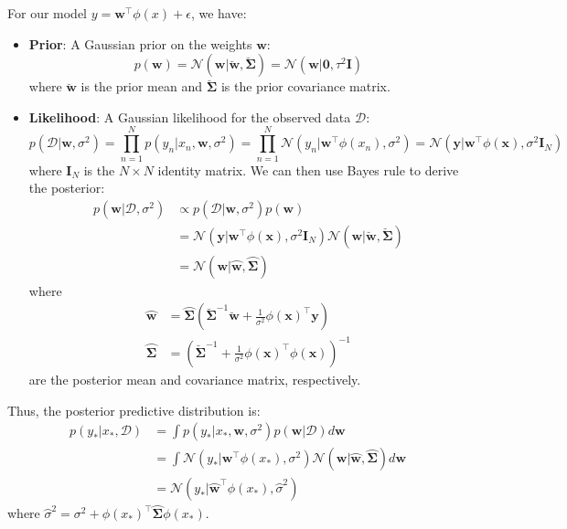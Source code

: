 \documentclass[11pt, a4paper, oneside]{memoir}
\begin{document}
For our model $y = \boldsymbol{w}^\top \phi(x) + \epsilon$, we have:
\begin{itemize}
    \item \textbf{Prior}: A Gaussian prior on the weights $\boldsymbol{w}$:
    \[ p(\boldsymbol{w}) = \mathcal{N}(\boldsymbol{w} | \breve{\boldsymbol{w}}, \breve{\boldsymbol{\Sigma}}) = \mathcal{N}(\boldsymbol{w} | \boldsymbol{0}, \tau^2 \boldsymbol{I}) \]
    where $\breve{\boldsymbol{w}}$ is the prior mean and $\breve{\boldsymbol{\Sigma}}$ is the prior covariance matrix.

    \item \textbf{Likelihood}: A Gaussian likelihood for the observed data $\mathcal{D}$:
    \[ p(\mathcal{D} | \boldsymbol{w}, \sigma^2) = \prod_{n=1}^N p(y_n | x_n, \boldsymbol{w}, \sigma^2) = \prod_{n=1}^N \mathcal{N}(y_n | \boldsymbol{w}^\top \phi(x_n), \sigma^2) = \mathcal{N}(\boldsymbol{y} | \boldsymbol{w}^\top \phi(\boldsymbol{x}), \sigma^2 \boldsymbol{I}_N) \]
    where $\boldsymbol{I}_N$ is the $N \times N$ identity matrix. We can then use Bayes rule to derive the posterior:
    \begin{align*}
      p(\boldsymbol{w} | \mathcal{D}, \sigma^2) &\propto p(\mathcal{D} | \boldsymbol{w}, \sigma^2) p(\boldsymbol{w}) \\
      &= \mathcal{N}(\boldsymbol{y} | \boldsymbol{w}^\top \phi(\boldsymbol{x}), \sigma^2 \boldsymbol{I}_N) \mathcal{N}(\boldsymbol{w} | \breve{\boldsymbol{w}}, \breve{\boldsymbol{\Sigma}}) \\
      &= \mathcal{N}(\boldsymbol{w} | \wideparen{\boldsymbol{w}}, \wideparen{\boldsymbol{\Sigma}})
    \end{align*}
    where
    \begin{align*}
      \wideparen{\boldsymbol{w}} &= \wideparen{\boldsymbol{\Sigma}} (\breve{\boldsymbol{\Sigma}}^{-1} \breve{\boldsymbol{w}} + \frac{1}{\sigma^2} \phi(\boldsymbol{x})^\top \boldsymbol{y}) \\
      \wideparen{\boldsymbol{\Sigma}} &= (\breve{\boldsymbol{\Sigma}}^{-1} + \frac{1}{\sigma^2} \phi(\boldsymbol{x})^\top \phi(\boldsymbol{x}))^{-1}
    \end{align*}
    are the posterior mean and covariance matrix, respectively.
\end{itemize}

Thus, the posterior predictive distribution is:
\begin{align*}
  p(y_* | x_*, \mathcal{D}) &= \int p(y_* | x_*, \boldsymbol{w}, \sigma^2) p(\boldsymbol{w} | \mathcal{D}) d\boldsymbol{w} \\
  &= \int \mathcal{N}(y_* | \boldsymbol{w}^\top \phi(x_*), \sigma^2) \mathcal{N}(\boldsymbol{w} | \wideparen{\boldsymbol{w}}, \wideparen{\boldsymbol{\Sigma}}) d\boldsymbol{w} \\
  &= \mathcal{N}(y_* | \wideparen{\boldsymbol{w}}^\top \phi(x_*), \wideparen{\sigma}^2)
\end{align*}
where $\wideparen{\sigma}^2 = \sigma^2 + \phi(x_*)^\top \wideparen{\boldsymbol{\Sigma}} \phi(x_*)$.
\end{document}
